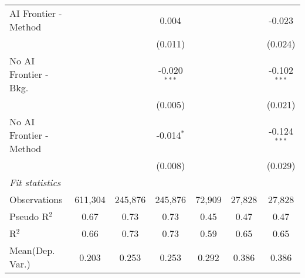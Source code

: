 \begin{tabular}{lcccccc}
   AI Frontier - Method    &                &                & 0.004          &                &                & -0.023\\   
                           &                &                & (0.011)        &                &                & (0.024)\\   
   No AI Frontier - Bkg.   &                &                & -0.020$^{***}$ &                &                & -0.102$^{***}$\\   
                           &                &                & (0.005)        &                &                & (0.021)\\   
   No AI Frontier - Method &                &                & -0.014$^{*}$   &                &                & -0.124$^{***}$\\   
                           &                &                & (0.008)        &                &                & (0.029)\\   
   \midrule
   \emph{Fit statistics}\\
   Observations            & 611,304        & 245,876        & 245,876        & 72,909         & 27,828         & 27,828\\  
   Pseudo R$^2$            & 0.67           & 0.73           & 0.73           & 0.45           & 0.47           & 0.47\\  
   R$^2$                   & 0.66           & 0.73           & 0.73           & 0.59           & 0.65           & 0.65\\  
Mean(Dep. Var.) & 0.203 & 0.253 & 0.253 & 0.292 & 0.386 & 0.386 \\
   

\end{tabular}
